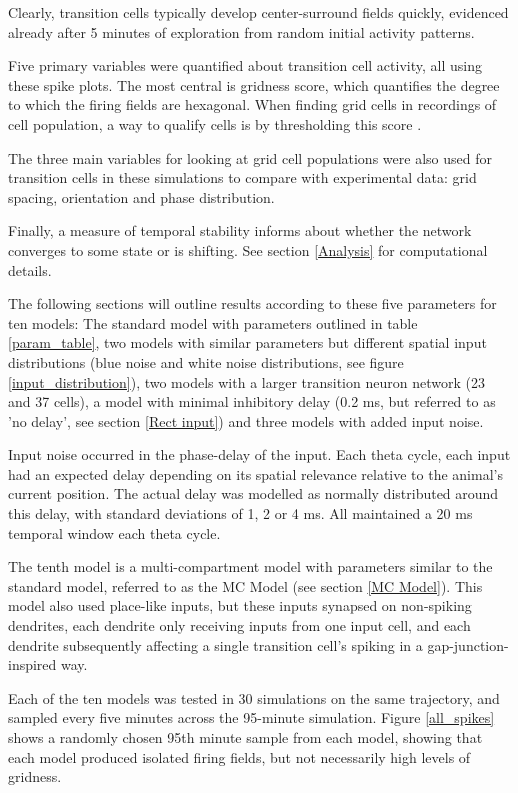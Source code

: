 \documentclass{article}
\begin{document}
    Clearly, transition cells typically develop center-surround fields quickly, evidenced already after 5 minutes of exploration from random initial activity patterns.

    Five primary variables were quantified about transition cell activity, all using these spike plots. The most central is gridness score, which quantifies the degree to which the firing fields are hexagonal. When finding grid cells in recordings of cell population, a way to qualify cells is by thresholding this score \parencite{Sargolini2006}.
    
    The three main variables for looking at grid cell populations were also used for transition cells in these simulations to compare with experimental data: grid spacing, orientation and phase distribution.
    
    Finally, a measure of temporal stability informs about whether the network converges to some state or is shifting. See section \ref{Analysis} for computational details.
    
    The following sections will outline results according to these five parameters for ten models: The standard model with parameters outlined in table \ref{param_table}, two models with similar parameters but different spatial input distributions (blue noise and white noise distributions, see figure \ref{input_distribution}), two models with a larger transition neuron network (23 and 37 cells), a model with minimal inhibitory delay (0.2 ms, but referred to as 'no delay', see section \ref{Rect input}) and three models with added input noise.
    
    Input noise occurred in the phase-delay of the input. Each theta cycle, each input had an expected delay depending on its spatial relevance relative to the animal's current position. The actual delay was modelled as normally distributed around this delay, with standard deviations of 1, 2 or 4 ms. All maintained a 20 ms temporal window each theta cycle.

    The tenth model is a multi-compartment model with parameters similar to the standard model, referred to as the MC Model (see section \ref{MC Model}). This model also used place-like inputs, but these inputs synapsed on non-spiking dendrites, each dendrite only receiving inputs from one input cell, and each dendrite subsequently affecting a single transition cell's spiking in a gap-junction-inspired way.

    Each of the ten models was tested in 30 simulations on the same trajectory, and sampled every five minutes across the 95-minute simulation. Figure \ref{all_spikes} shows a randomly chosen 95th minute sample from each model, showing that each model produced isolated firing fields, but not necessarily high levels of gridness.
\end{document}
